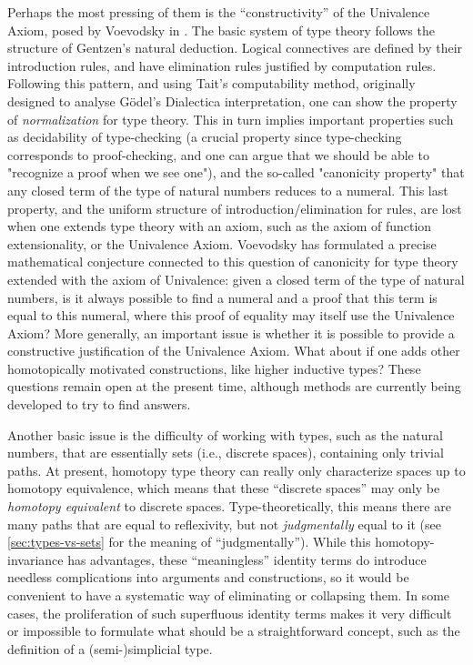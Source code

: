 Perhaps the most pressing of them is the ``constructivity'' of the Univalence Axiom, posed by Voevodsky in \cite{Vo2012}.
The basic system of type theory follows the structure of Gentzen's natural deduction. Logical connectives are defined by their introduction rules, and have elimination rules justified by computation rules. Following this pattern, and using Tait's computability method, originally designed to analyse G\"odel's Dialectica interpretation, one can show the property of {\em normalization} for type theory. This in turn implies important properties such as decidability of type-checking (a crucial property since type-checking corresponds to proof-checking, and one can argue that we should be able to "recognize a proof when we see one"), and the so-called "canonicity property" that any closed term of the type of natural numbers reduces to a numeral. This last property, and the uniform structure of introduction/elimination for rules, are lost when one extends type theory with an axiom, such as the axiom of function extensionality, or the Univalence Axiom. Voevodsky has formulated a precise mathematical conjecture connected to this question of canonicity for type theory extended with the axiom of Univalence: given a closed term of the type of natural numbers, is it always possible to find a numeral and a proof that this term is equal to this numeral, where this proof of equality may itself use the Univalence Axiom? More generally, an important issue is whether it is possible to provide a constructive justification of the Univalence Axiom.
What about if one adds other homotopically motivated constructions, like higher inductive types?
These questions remain open at the present time, although methods are currently being developed to try to find answers.

Another basic issue is the difficulty of working with types, such as the natural numbers, that are essentially sets (i.e., discrete spaces), containing only trivial paths.
At present, homotopy type theory can really only characterize spaces up to homotopy equivalence, which means that these ``discrete spaces'' may only be \emph{homotopy equivalent} to discrete spaces.
Type-theoretically, this means there are many paths that are equal to reflexivity, but not \emph{judgmentally} equal to it (see \cref{sec:types-vs-sets} for the meaning of ``judgmentally'').
While this homotopy-invariance has advantages, these ``meaningless'' identity terms do introduce needless complications into arguments and constructions, so it would be convenient to have a systematic way of eliminating or collapsing them.
In some cases, the proliferation of such superfluous identity terms makes it very difficult or impossible to formulate what should be a straightforward concept, such as the definition of a (semi-)simplicial type.

